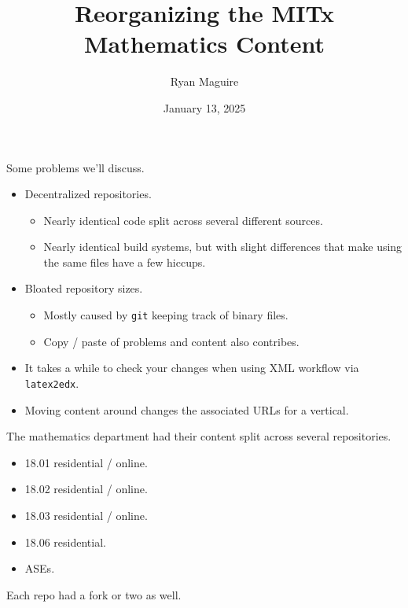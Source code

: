 \documentclass{beamer}
\title{Reorganizing the MITx Mathematics Content}
\author{Ryan Maguire}
\date{January 13, 2025}
\begin{document}
    \maketitle
    \begin{frame}
        Some problems we'll discuss.
        \begin{itemize}
            \item
                Decentralized repositories.
                \begin{itemize}
                    \item
                        Nearly identical code split
                        across several different sources.
                    \item
                        Nearly identical build systems, but with slight
                        differences that make using the same files have
                        a few hiccups.
                \end{itemize}
            \item
                Bloated repository sizes.
                \begin{itemize}
                    \item
                        Mostly caused by \texttt{git} keeping track of
                        binary files.
                    \item
                        Copy / paste of problems and content also contribes.
                \end{itemize}
            \item
                It takes a while to check your changes when using
                XML workflow via \texttt{latex2edx}.
            \item
                Moving content around changes the associated URLs for a
                vertical.
        \end{itemize}
    \end{frame}
    \begin{frame}
        The mathematics department had their content split across several
        repositories.
        \begin{itemize}
            \item 18.01 residential / online.
            \item 18.02 residential / online.
            \item 18.03 residential / online.
            \item 18.06 residential.
            \item ASEs.
        \end{itemize}
        Each repo had a fork or two as well.
    \end{frame}
\end{document}
